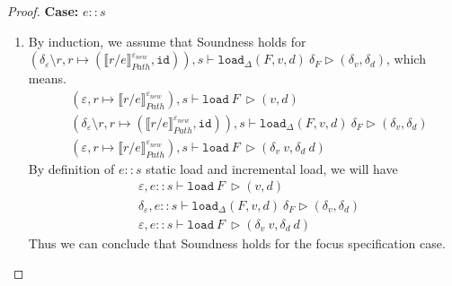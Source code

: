 \documentclass[10pt,twoside,a4paper]{article}
\theoremstyle{theorem}
\theoremstyle{lemma}
\theoremstyle{property}
\theoremstyle{definition}
\theoremstyle{assumption}
\def\id{\mathtt{id}}
\begin{document}
\begin{proof}
	\textbf{Case: } $e::s$\\
	\begin{enumerate}
	\item 
	By induction, we assume that Soundness holds for $(\delta_\varepsilon \setminus r, r \mapsto (\llbracket r/e \rrbracket^{\varepsilon_{new}}_{Path}, \id)) , s \vdash \mathtt{load}_\Delta (F,v,d)~ \delta_F \rhd (\delta_v,\delta_d)$, which means.
	\begin{align*}
			& (\varepsilon, r \mapsto \llbracket r/e \rrbracket^{\varepsilon_{new}}_{Path}), s \vdash \mathtt{load}~ F~ \rhd (v,d)\\
			& (\delta_\varepsilon \setminus r, r \mapsto (\llbracket r/e \rrbracket^{\varepsilon_{new}}_{Path}, \id)) , s \vdash \mathtt{load}_\Delta (F,v,d)~ \delta_F \rhd (\delta_v,\delta_d)\\
			& (\varepsilon, r \mapsto \llbracket r/e \rrbracket^{\varepsilon_{new}}_{Path}), s \vdash \mathtt{load}~ F~ \rhd (\delta_v~v,\delta_d~d)
	\end{align*}
	By definition of $e::s$ static load and incremental load, we will have
	\begin{align*}
			& \varepsilon, e::s \vdash \mathtt{load}~ F~ \rhd (v,d)\\
			& \delta_\varepsilon, e::s \vdash \mathtt{load}_\Delta (F,v,d)~ \delta_F \rhd (\delta_v,\delta_d)\\
			& \varepsilon, e::s \vdash \mathtt{load}~ F~ \rhd (\delta_v~v,\delta_d~d)
	\end{align*}
	Thus we can conclude that Soundness holds for the focus specification case.
	\end{enumerate}
	

\end{proof}
\end{document}
